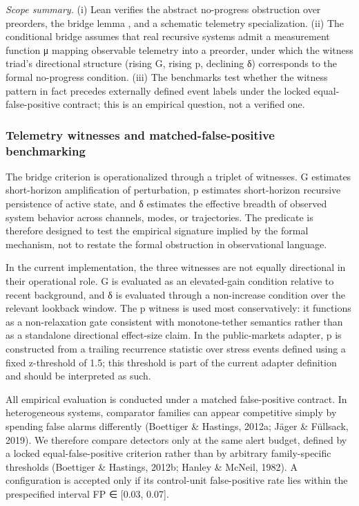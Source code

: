 \documentclass[
  11pt,
]{article}
\begin{document}
\emph{Scope summary.} (i) Lean verifies the abstract no-progress
obstruction over preorders, the bridge lemma
\texttt{}, and a schematic telemetry
specialization. (ii) The conditional bridge assumes that real recursive
systems admit a measurement function μ mapping observable telemetry into
a preorder, under which the witness triad's directional structure
(rising G, rising p, declining δ) corresponds to the formal no-progress
condition. (iii) The benchmarks test whether the witness pattern in fact
precedes externally defined event labels under the locked
equal-false-positive contract; this is an empirical question, not a
verified one.

\subsubsection{Telemetry witnesses and matched-false-positive
benchmarking}\label{telemetry-witnesses-and-matched-false-positive-benchmarking}

The bridge criterion is operationalized through a triplet of witnesses.
G estimates short-horizon amplification of perturbation, p estimates
short-horizon recursive persistence of active state, and δ estimates the
effective breadth of observed system behavior across channels, modes, or
trajectories. The predicate is therefore designed to test the empirical
signature implied by the formal mechanism, not to restate the formal
obstruction in observational language.

In the current implementation, the three witnesses are not equally
directional in their operational role. G is evaluated as an
elevated-gain condition relative to recent background, and δ is
evaluated through a non-increase condition over the relevant lookback
window. The p witness is used most conservatively: it functions as a
non-relaxation gate consistent with monotone-tether semantics rather
than as a standalone directional effect-size claim. In the
public-markets adapter, p is constructed from a trailing recurrence
statistic over stress events defined using a fixed z-threshold of 1.5;
this threshold is part of the current adapter definition and should be
interpreted as such.

All empirical evaluation is conducted under a matched false-positive
contract. In heterogeneous systems, comparator families can appear
competitive simply by spending false alarms differently (Boettiger \&
Hastings, 2012a; Jäger \& Füllsack, 2019). We therefore compare
detectors only at the same alert budget, defined by a locked
equal-false-positive criterion rather than by arbitrary family-specific
thresholds (Boettiger \& Hastings, 2012b; Hanley \& McNeil, 1982). A
configuration is accepted only if its control-unit false-positive rate
lies within the prespecified interval FP ∈ {[}0.03, 0.07{]}.
\end{document}
